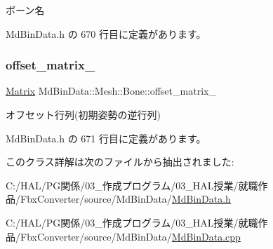 ボーン名 



 Md\+Bin\+Data.\+h の 670 行目に定義があります。

\mbox{\label{class_md_bin_data_1_1_mesh_1_1_bone_ab2119901317e2beb384a36d40f31c385}} 
\subsubsection{\texorpdfstring{offset\+\_\+matrix\+\_\+}{offset\_matrix\_}}
{\footnotesize\ttfamily \mbox{\hyperlink{class_md_bin_data_1_1_matrix}{Matrix}} Md\+Bin\+Data\+::\+Mesh\+::\+Bone\+::offset\+\_\+matrix\+\_\+\hspace{0.3cm}{\ttfamily [private]}}



オフセット行列(初期姿勢の逆行列) 



 Md\+Bin\+Data.\+h の 671 行目に定義があります。



このクラス詳解は次のファイルから抽出されました\+:\begin{DoxyCompactItemize}
\item 
C\+:/\+H\+A\+L/\+P\+G関係/03\+\_\+作成プログラム/03\+\_\+\+H\+A\+L授業/就職作品/\+Fbx\+Converter/source/\+Md\+Bin\+Data/\mbox{\hyperlink{_md_bin_data_8h}{Md\+Bin\+Data.\+h}}\item 
C\+:/\+H\+A\+L/\+P\+G関係/03\+\_\+作成プログラム/03\+\_\+\+H\+A\+L授業/就職作品/\+Fbx\+Converter/source/\+Md\+Bin\+Data/\mbox{\hyperlink{_md_bin_data_8cpp}{Md\+Bin\+Data.\+cpp}}\end{DoxyCompactItemize}
